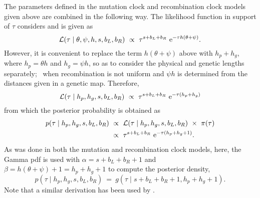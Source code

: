 The parameters defined in the mutation clock and recombination clock models given above are combined in the following way.
The likelihood function in support of $\tau$ considers  and is given as
\begin{equation*}
	\mathcal{L}(\tau \mid \theta,\psi,h,s,b_L,b_R)~\propto~\tau^{s+b_L+b_R} \,\,\mathrm{e}^{-\tau h(\theta+\psi)}\text{.}
\end{equation*}
However, it is convenient to replace the term ${h(\theta+\psi)}$ above with ${h_p + h_g}$, where $h_p=\theta h$ and ${h_g=\psi h}$, so as to consider the physical and genetic lengths separately; \eg~when recombination is not uniform and ${\psi h}$ is determined from the distances given in a genetic map.
Therefore,
\begin{equation}\label{eq:com_like}
	\mathcal{L}(\tau \mid h_p,h_g,s,b_L,b_R)~\propto~\tau^{s+b_L+b_R} \,\,\mathrm{e}^{-\tau  (h_p + h_g)}
\end{equation}
from which the posterior probability is obtained as
\begin{equation}
	\begin{split}
		p(\tau \mid h_p,h_g,s,b_L,b_R)
		&~\propto~
		\mathcal{L}(\tau \mid h_p,h_g,s,b_L,b_R)~\times~\pi(\tau) \\
		&~\propto~
		\tau^{s + b_L + b_R} \,\,\mathrm{e}^{-\tau(h_p + h_g + 1)}\text{.}
	\end{split}
\end{equation}
As was done in both the mutation and recombination clock models, here, the Gamma \gls{pdf} is used with ${\alpha = s + b_L + b_R +1}$ and ${\beta = h(\theta + \psi) +1 = h_p + h_g + 1}$
to compute the posterior density, \ie
\begin{equation}
	p(\tau \mid h_p,h_g,s,b_L,b_R)~=~g(\tau\mid s + b_L + b_R +1, h_p + h_g + 1)\text{.}
\end{equation}
Note that a similar derivation has been used by \citet{schroff2016}.



